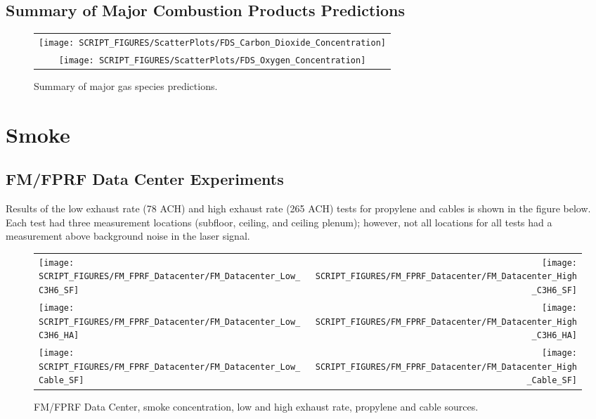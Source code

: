 \clearpage


\subsection{Summary of Major Combustion Products Predictions}
\label{Carbon Dioxide Concentration}
\label{Oxygen Concentration}


\begin{figure}[!h]
\centering
\begin{tabular}{c}
\texttt{[image: SCRIPT\_FIGURES/ScatterPlots/FDS\_Carbon\_Dioxide\_Concentration]} \\
\texttt{[image: SCRIPT\_FIGURES/ScatterPlots/FDS\_Oxygen\_Concentration]}
\end{tabular}
\caption[Summary of major gas species predictions]
{Summary of major gas species predictions.}
\end{figure}

\clearpage


\section{Smoke}

\subsection{FM/FPRF Data Center Experiments}
\label{FM Smoke Concentration}

Results of the low exhaust rate (78 ACH) and high exhaust rate (265 ACH) tests for propylene and cables is shown in the figure below. Each test had three measurement locations (subfloor, ceiling, and ceiling plenum); however, not all locations for all tests had a measurement above background noise in the laser signal.

\begin{figure}[!h]
\begin{tabular*}{\textwidth}{l@{\extracolsep{\fill}}r}
\texttt{[image: SCRIPT\_FIGURES/FM\_FPRF\_Datacenter/FM\_Datacenter\_Low\_C3H6\_SF]} &
\texttt{[image: SCRIPT\_FIGURES/FM\_FPRF\_Datacenter/FM\_Datacenter\_High\_C3H6\_SF]} \\
\texttt{[image: SCRIPT\_FIGURES/FM\_FPRF\_Datacenter/FM\_Datacenter\_Low\_C3H6\_HA]} &
\texttt{[image: SCRIPT\_FIGURES/FM\_FPRF\_Datacenter/FM\_Datacenter\_High\_C3H6\_HA]} \\
\texttt{[image: SCRIPT\_FIGURES/FM\_FPRF\_Datacenter/FM\_Datacenter\_Low\_Cable\_SF]} &
\texttt{[image: SCRIPT\_FIGURES/FM\_FPRF\_Datacenter/FM\_Datacenter\_High\_Cable\_SF]}
\end{tabular*}
\caption[FM/FPRF Data Center, smoke concentration, propylene and cable sources]{FM/FPRF Data Center, smoke concentration, low and high exhaust rate, propylene and cable sources.}
\label{FM_FPRF_Datacenter_Smoke}
\end{figure}

